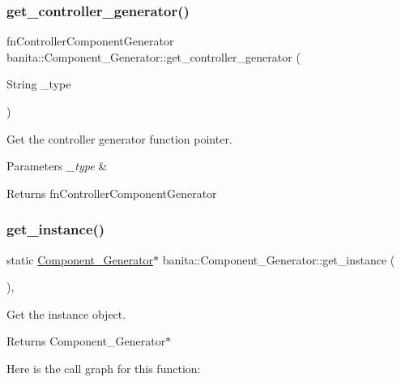 \subsubsection{\texorpdfstring{get\_controller\_generator()}{get\_controller\_generator()}}
{\footnotesize\ttfamily fn\+Controller\+Component\+Generator banita\+::\+Component\+\_\+\+Generator\+::get\+\_\+controller\+\_\+generator (\begin{DoxyParamCaption}\item[{String}]{\+\_\+type }\end{DoxyParamCaption})\hspace{0.3cm}{\ttfamily [inline]}}



Get the controller generator function pointer. 


\begin{DoxyParams}{Parameters}
{\em \+\_\+type} & \\
\hline
\end{DoxyParams}
\begin{DoxyReturn}{Returns}
fn\+Controller\+Component\+Generator 
\end{DoxyReturn}
\mbox{\label{classbanita_1_1_component___generator_a58161267b33b3a6e67edfed079196ebd}} 
\subsubsection{\texorpdfstring{get\_instance()}{get\_instance()}}
{\footnotesize\ttfamily static \mbox{\hyperlink{classbanita_1_1_component___generator}{Component\+\_\+\+Generator}}$\ast$ banita\+::\+Component\+\_\+\+Generator\+::get\+\_\+instance (\begin{DoxyParamCaption}{ }\end{DoxyParamCaption})\hspace{0.3cm}{\ttfamily [inline]}, {\ttfamily [static]}}



Get the instance object. 

\begin{DoxyReturn}{Returns}
Component\+\_\+\+Generator$\ast$ 
\end{DoxyReturn}
Here is the call graph for this function\+:
\mbox{\label{classbanita_1_1_component___generator_a6c94801a7c5c3eb6aedc0c97bf786b39}} 
